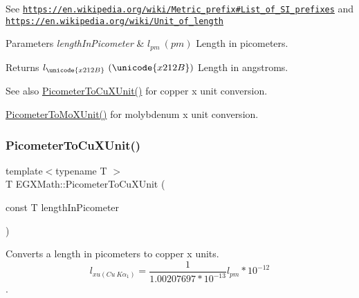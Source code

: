 See \href{https://en.wikipedia.org/wiki/Metric_prefix#List_of_SI_prefixes}{\tt https\+://en.\+wikipedia.\+org/wiki/\+Metric\+\_\+prefix\#\+List\+\_\+of\+\_\+\+S\+I\+\_\+prefixes} and \href{https://en.wikipedia.org/wiki/Unit_of_length}{\tt https\+://en.\+wikipedia.\+org/wiki/\+Unit\+\_\+of\+\_\+length} 
\begin{DoxyParams}{Parameters}
{\em length\+In\+Picometer} & $ l_{pm}\ (pm)$ Length in picometers. \\
\hline
\end{DoxyParams}
\begin{DoxyReturn}{Returns}
$ l_{\unicode{x212B}}\ (\unicode{x212B})$ Length in angstroms. 
\end{DoxyReturn}
\begin{DoxySeeAlso}{See also}
\mbox{\hyperlink{group___e_g_x_math-_conversions-_length_conversions-_picometer-_non-_s_i_gab393c0c7c90ba14ff56f8eac343524ff}{Picometer\+To\+Cu\+X\+Unit()}} for copper x unit conversion. 

\mbox{\hyperlink{group___e_g_x_math-_conversions-_length_conversions-_picometer-_non-_s_i_ga51b96b4bb30b7e9c971db81ff89a82f8}{Picometer\+To\+Mo\+X\+Unit()}} for molybdenum x unit conversion. 
\end{DoxySeeAlso}
\mbox{\label{group___e_g_x_math-_conversions-_length_conversions-_picometer-_non-_s_i_gab393c0c7c90ba14ff56f8eac343524ff}} 
\subsubsection{\texorpdfstring{Picometer\+To\+Cu\+X\+Unit()}{PicometerToCuXUnit()}}
{\footnotesize\ttfamily template$<$typename T $>$ \\
T E\+G\+X\+Math\+::\+Picometer\+To\+Cu\+X\+Unit (\begin{DoxyParamCaption}\item[{const T}]{length\+In\+Picometer }\end{DoxyParamCaption})}



Converts a length in picometers to copper x units. \[ l_{xu(Cu\ K\alpha_1)}= \frac{1}{1.00207697*10^{-13}} l_{pm} * 10^{-12}\]. 


